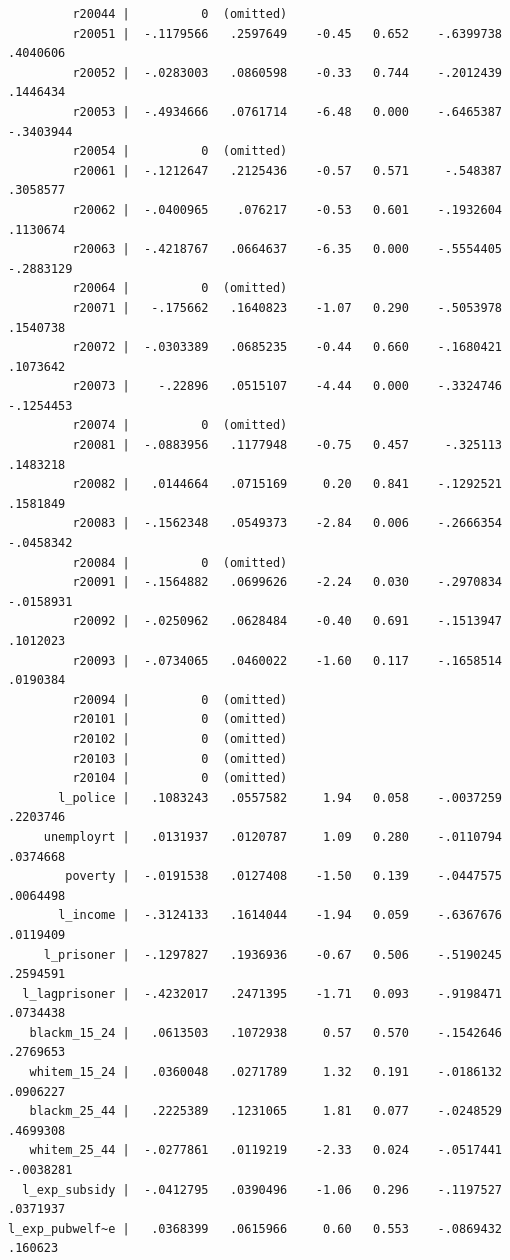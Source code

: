 \documentclass[
]{book}
\begin{document}
\begin{verbatim}
         r20044 |          0  (omitted)
         r20051 |  -.1179566   .2597649    -0.45   0.652    -.6399738    .4040606
         r20052 |  -.0283003   .0860598    -0.33   0.744    -.2012439    .1446434
         r20053 |  -.4934666   .0761714    -6.48   0.000    -.6465387   -.3403944
         r20054 |          0  (omitted)
         r20061 |  -.1212647   .2125436    -0.57   0.571     -.548387    .3058577
         r20062 |  -.0400965    .076217    -0.53   0.601    -.1932604    .1130674
         r20063 |  -.4218767   .0664637    -6.35   0.000    -.5554405   -.2883129
         r20064 |          0  (omitted)
         r20071 |   -.175662   .1640823    -1.07   0.290    -.5053978    .1540738
         r20072 |  -.0303389   .0685235    -0.44   0.660    -.1680421    .1073642
         r20073 |    -.22896   .0515107    -4.44   0.000    -.3324746   -.1254453
         r20074 |          0  (omitted)
         r20081 |  -.0883956   .1177948    -0.75   0.457     -.325113    .1483218
         r20082 |   .0144664   .0715169     0.20   0.841    -.1292521    .1581849
         r20083 |  -.1562348   .0549373    -2.84   0.006    -.2666354   -.0458342
         r20084 |          0  (omitted)
         r20091 |  -.1564882   .0699626    -2.24   0.030    -.2970834   -.0158931
         r20092 |  -.0250962   .0628484    -0.40   0.691    -.1513947    .1012023
         r20093 |  -.0734065   .0460022    -1.60   0.117    -.1658514    .0190384
         r20094 |          0  (omitted)
         r20101 |          0  (omitted)
         r20102 |          0  (omitted)
         r20103 |          0  (omitted)
         r20104 |          0  (omitted)
       l_police |   .1083243   .0557582     1.94   0.058    -.0037259    .2203746
     unemployrt |   .0131937   .0120787     1.09   0.280    -.0110794    .0374668
        poverty |  -.0191538   .0127408    -1.50   0.139    -.0447575    .0064498
       l_income |  -.3124133   .1614044    -1.94   0.059    -.6367676    .0119409
     l_prisoner |  -.1297827   .1936936    -0.67   0.506    -.5190245    .2594591
  l_lagprisoner |  -.4232017   .2471395    -1.71   0.093    -.9198471    .0734438
   blackm_15_24 |   .0613503   .1072938     0.57   0.570    -.1542646    .2769653
   whitem_15_24 |   .0360048   .0271789     1.32   0.191    -.0186132    .0906227
   blackm_25_44 |   .2225389   .1231065     1.81   0.077    -.0248529    .4699308
   whitem_25_44 |  -.0277861   .0119219    -2.33   0.024    -.0517441   -.0038281
  l_exp_subsidy |  -.0412795   .0390496    -1.06   0.296    -.1197527    .0371937
l_exp_pubwelf~e |   .0368399   .0615966     0.60   0.553    -.0869432     .160623

\end{verbatim}
\end{document}
